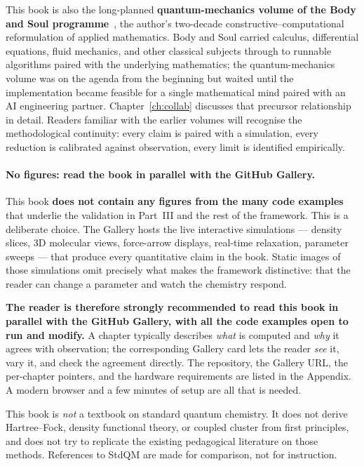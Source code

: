 This book is also the long-planned \textbf{quantum-mechanics volume of the Body and Soul programme}~\cite{BodyAndSoulI,BodyAndSoulII,BodyAndSoulIII,BodyAndSoulIV,BodyAndSoulV}, the author's two-decade constructive--computational reformulation of applied mathematics. Body and Soul carried calculus, differential equations, fluid mechanics, and other classical subjects through to runnable algorithms paired with the underlying mathematics; the quantum-mechanics volume was on the agenda from the beginning but waited until the implementation became feasible for a single mathematical mind paired with an AI engineering partner. Chapter~\ref{ch:collab} discusses that precursor relationship in detail. Readers familiar with the earlier volumes will recognise the methodological continuity: every claim is paired with a simulation, every reduction is calibrated against observation, every limit is identified empirically.

\paragraph{No figures: read the book in parallel with the GitHub Gallery.}
This book \textbf{does not contain any figures from the many code examples} that underlie the validation in Part~III and the rest of the framework. This is a deliberate choice. The Gallery hosts the live interactive simulations --- density slices, 3D molecular views, force-arrow displays, real-time relaxation, parameter sweeps --- that produce every quantitative claim in the book. Static images of those simulations omit precisely what makes the framework distinctive: that the reader can change a parameter and watch the chemistry respond.

\textbf{The reader is therefore strongly recommended to read this book in parallel with the GitHub Gallery, with all the code examples open to run and modify.} A chapter typically describes \emph{what} is computed and \emph{why} it agrees with observation; the corresponding Gallery card lets the reader \emph{see} it, vary it, and check the agreement directly. The repository, the Gallery URL, the per-chapter pointers, and the hardware requirements are listed in the Appendix. A modern browser and a few minutes of setup are all that is needed.

This book is \emph{not} a textbook on standard quantum chemistry. It does not derive Hartree--Fock, density functional theory, or coupled cluster from first principles, and does not try to replicate the existing pedagogical literature on those methods. References to StdQM are made for comparison, not for instruction.

